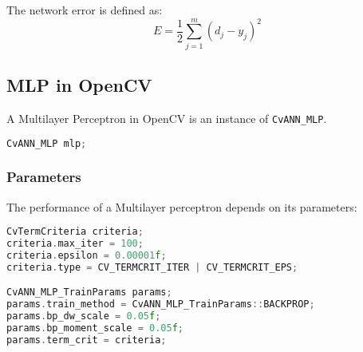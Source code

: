 The network error is defined as:
$$E = \frac{1}{2} \sum_{j=1}^{m}{(d_j - y_j)^2} $$

\subsection{MLP in OpenCV}
A Multilayer Perceptron in OpenCV is an instance of \lstinline|CvANN_MLP|.

\begin{lstlisting}[language=C++]
CvANN_MLP mlp;
\end{lstlisting}

\subsubsection*{Parameters}
The performance of a Multilayer perceptron depends on its parameters:

\begin{lstlisting}[language=C++]
CvTermCriteria criteria;
criteria.max_iter = 100;
criteria.epsilon = 0.00001f;
criteria.type = CV_TERMCRIT_ITER | CV_TERMCRIT_EPS;

CvANN_MLP_TrainParams params;
params.train_method = CvANN_MLP_TrainParams::BACKPROP;
params.bp_dw_scale = 0.05f;
params.bp_moment_scale = 0.05f;
params.term_crit = criteria;
\end{lstlisting}

